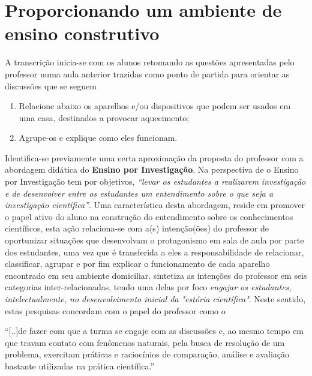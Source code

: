 \section{Proporcionando um ambiente de ensino construtivo}
\label{sec: analise-transcricao}
A transcrição inicia-se com os alunos retomando as questões apresentadas pelo professor numa aula anterior trazidas como ponto de partida para orientar as discussões que se seguem
\begin{enumerate}[label=\roman *)]
    \item Relacione abaixo os aparelhos e/ou dispositivos que podem ser usados em uma casa, destinados a provocar aquecimento;
    \item Agrupe-os e explique como eles funcionam.
\end{enumerate}
Identifica-se previamente uma certa aproximação da proposta do professor com a abordagem didática do \textbf{Ensino por Investigação}. Na perspectiva de  o Ensino por Investigação tem por objetivos, \emph{``levar os estudantes a realizarem investigação e de desenvolver entre os estudantes um entendimento sobre o que seja a investigação científica''}. Uma característica desta abordagem, reside em promover o papel ativo do aluno na construção do entendimento sobre os conhecimentos científicos, esta ação relaciona-se com a(s) intenção(ões) do professor de oportunizar situações que desenvolvam o protagonismo em sala de aula por parte dos estudantes, uma vez que é transferida a eles a responsabilidade de relacionar, classificar, agrupar e por fim explicar o funcionamento de cada aparelho encontrado em seu ambiente domiciliar. \cite{MORTIMER:2002} sintetiza as intenções do professor em seis categorias inter-relacionadas, tendo uma delas por foco \emph{engajar os estudantes, intelectualmente, no desenvolvimento inicial da "estória científica"}. Neste sentido, estas pesquisas concordam com o papel do professor como o
\begin{citacao}
    ``[..]de fazer com que a turma se engaje com as discussões e, ao mesmo tempo em que travam contato com fenômenos naturais, pela busca de resolução de um problema, exercitam práticas e raciocínios de comparação, análise e avaliação bastante utilizadas na prática científica.'' \cite[p. 58]{SASSERON:2015}
\end{citacao}

